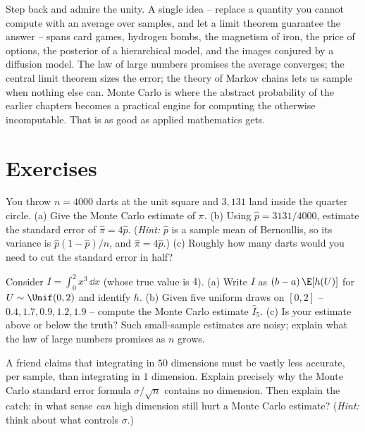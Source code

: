 \begin{aestheticbox}
Step back and admire the unity. A single idea -- replace a quantity you cannot
compute with an average over samples, and let a limit theorem guarantee the
answer -- spans card games, hydrogen bombs, the magnetism of iron, the price of
options, the posterior of a hierarchical model, and the images conjured by a
diffusion model. The law of large numbers promises the average converges; the
central limit theorem sizes the error; the theory of Markov chains lets us sample
when nothing else can. Monte Carlo is where the abstract probability of the
earlier chapters becomes a practical engine for computing the otherwise
incomputable. That is as good as applied mathematics gets.
\end{aestheticbox}

\section{Exercises}
\label{ch35:exercises}

\begin{exercise}
\label{ch35:exr-pi}
You throw $n = 4000$ darts at the unit square and $3{,}131$ land inside the
quarter circle. (a) Give the Monte Carlo estimate of $\pi$. (b) Using
$\hat p = 3131/4000$, estimate the standard error of $\hat\pi = 4\hat p$.
(\emph{Hint:} $\hat p$ is a sample mean of Bernoullis, so its variance is
$\hat p(1-\hat p)/n$, and $\hat\pi = 4\hat p$.) (c) Roughly how many darts would
you need to cut the standard error in half?
\end{exercise}

\begin{exercise}
\label{ch35:exr-integral}
Consider $I = \int_0^2 x^3 \, \dd x$ (whose true value is $4$). (a) Write $I$ as
$(b-a)\,\E[h(U)]$ for $U \sim \Unif(0,2)$ and identify $h$. (b) Given five uniform
draws on $[0,2]$ -- $0.4, 1.7, 0.9, 1.2, 1.9$ -- compute the Monte Carlo estimate
$\hat I_5$. (c) Is your estimate above or below the truth? Such small-sample
estimates are noisy; explain what the law of large numbers promises as $n$ grows.
\end{exercise}

\begin{exercise}
\label{ch35:exr-dimension}
A friend claims that integrating in $50$ dimensions must be vastly less accurate,
per sample, than integrating in $1$ dimension. Explain precisely why the Monte
Carlo standard error formula $\sigma/\sqrt n$ contains no dimension. Then explain
the catch: in what sense \emph{can} high dimension still hurt a Monte Carlo
estimate? (\emph{Hint:} think about what controls $\sigma$.)
\end{exercise}

